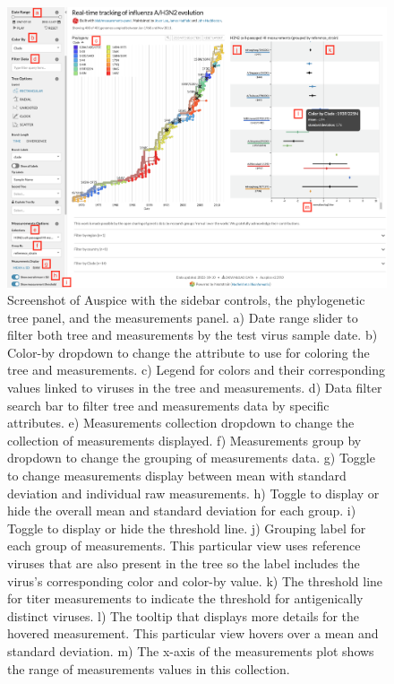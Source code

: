 \documentclass[utf8]{FrontiersinHarvard} %
\begin{document}
\begin{figure}[h!]
  \begin{center}
    \includegraphics[width=\textwidth]{figures/figure-2-screen-shot}
  \end{center}
  \caption{
    Screenshot of Auspice with the sidebar controls, the phylogenetic tree panel, and the measurements panel.
a) Date range slider to filter both tree and measurements by the test virus sample date.
b) Color-by dropdown to change the attribute to use for coloring the tree and measurements.
c) Legend for colors and their corresponding values linked to viruses in the tree and measurements.
d) Data filter search bar to filter tree and measurements data by specific attributes.
e) Measurements collection dropdown to change the collection of measurements displayed.
f) Measurements group by dropdown to change the grouping of measurements data.
g) Toggle to change measurements display between mean with standard deviation and individual raw measurements.
h) Toggle to display or hide the overall mean and standard deviation for each group.
i) Toggle to display or hide the threshold line.
j) Grouping label for each group of measurements.
This particular view uses reference viruses that are also present in the tree so the label includes the virus's corresponding color and color-by value.
k) The threshold line for titer measurements to indicate the threshold for antigenically distinct viruses.
l) The tooltip that displays more details for the hovered measurement.
This particular view hovers over a mean and standard deviation.
m) The x-axis of the measurements plot shows the range of measurements values in this collection.
  }\label{fig:2}
\end{figure}
\end{document}
